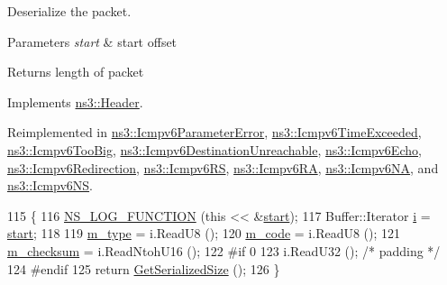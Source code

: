 Deserialize the packet. 


\begin{DoxyParams}{Parameters}
{\em start} & start offset \\
\hline
\end{DoxyParams}
\begin{DoxyReturn}{Returns}
length of packet 
\end{DoxyReturn}


Implements \hyperlink{classns3_1_1Header_a78be9400bb66b2a8543606f395ef5396}{ns3\+::\+Header}.



Reimplemented in \hyperlink{classns3_1_1Icmpv6ParameterError_a9adc32f79c63175a9dde08e017746794}{ns3\+::\+Icmpv6\+Parameter\+Error}, \hyperlink{classns3_1_1Icmpv6TimeExceeded_aaa984e51f29224f2bddd776dae8154cf}{ns3\+::\+Icmpv6\+Time\+Exceeded}, \hyperlink{classns3_1_1Icmpv6TooBig_a2d0f077afd744d980a93fee1b5df93a4}{ns3\+::\+Icmpv6\+Too\+Big}, \hyperlink{classns3_1_1Icmpv6DestinationUnreachable_aab4cce60f9e44ae3bdca60d7157c1cd1}{ns3\+::\+Icmpv6\+Destination\+Unreachable}, \hyperlink{classns3_1_1Icmpv6Echo_ad3ce875667e23c4b406860d6d95c3385}{ns3\+::\+Icmpv6\+Echo}, \hyperlink{classns3_1_1Icmpv6Redirection_abcfbc9f63e544250bb40c302c0537788}{ns3\+::\+Icmpv6\+Redirection}, \hyperlink{classns3_1_1Icmpv6RS_a9b7bf06890d0aa82bc87bf70cf6181dd}{ns3\+::\+Icmpv6\+RS}, \hyperlink{classns3_1_1Icmpv6RA_a91908412f051db52bd63b7a0d01c1117}{ns3\+::\+Icmpv6\+RA}, \hyperlink{classns3_1_1Icmpv6NA_ade6ada5c42f4342a466139d75699718b}{ns3\+::\+Icmpv6\+NA}, and \hyperlink{classns3_1_1Icmpv6NS_aa2fa4464ead95a030997d55f1f023dc0}{ns3\+::\+Icmpv6\+NS}.


\begin{DoxyCode}
115 \{
116   \hyperlink{log-macros-disabled_8h_a90b90d5bad1f39cb1b64923ea94c0761}{NS\_LOG\_FUNCTION} (\textcolor{keyword}{this} << &\hyperlink{namespacevisualizer_1_1core_a2a35e5d8a34af358b508dac8635754e0}{start});
117   Buffer::Iterator \hyperlink{bernuolliDistribution_8m_a6f6ccfcf58b31cb6412107d9d5281426}{i} = \hyperlink{namespacevisualizer_1_1core_a2a35e5d8a34af358b508dac8635754e0}{start};
118 
119   \hyperlink{classns3_1_1Icmpv6Header_ab8ff041725f233554ea52c49a29ee1a9}{m\_type} = i.ReadU8 ();
120   \hyperlink{classns3_1_1Icmpv6Header_a4f0268e1df07589e9fb7da198592fdf9}{m\_code} = i.ReadU8 ();
121   \hyperlink{classns3_1_1Icmpv6Header_a6fe65b5998d91492bf6c1e13c8a0f29c}{m\_checksum} = i.ReadNtohU16 ();
122 \textcolor{preprocessor}{#if 0}
123   i.ReadU32 (); \textcolor{comment}{/* padding */}
124 \textcolor{preprocessor}{#endif}
125   \textcolor{keywordflow}{return} \hyperlink{classns3_1_1Icmpv6Header_aa2ec90815fc1ccc54632424ca3b87e96}{GetSerializedSize} ();
126 \}
\end{DoxyCode}


